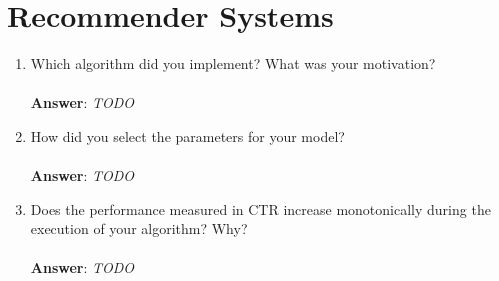 \documentclass[11pt]{article}
\begin{document}
\section{Recommender Systems}

\begin{enumerate}
\item Which algorithm did you implement? What was your motivation? \\ \\
\textbf{Answer}: \emph{TODO}

\item How did you select the parameters for your model? \\ \\
\textbf{Answer}: \emph{TODO}

\item Does the performance measured in CTR increase monotonically during the
execution of your algorithm? Why? \\ \\
\textbf{Answer}: \emph{TODO}

\end{enumerate}
\end{document}
